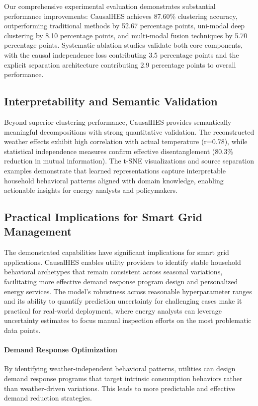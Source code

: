 \documentclass[journal]{IEEEtran}
\begin{document}
Our comprehensive experimental evaluation demonstrates substantial performance improvements: CausalHES achieves 87.60\% clustering accuracy, outperforming traditional methods by 52.67 percentage points, uni-modal deep clustering by 8.10 percentage points, and multi-modal fusion techniques by 5.70 percentage points. Systematic ablation studies validate both core components, with the causal independence loss contributing 3.5 percentage points and the explicit separation architecture contributing 2.9 percentage points to overall performance.

\subsection{Interpretability and Semantic Validation}
Beyond superior clustering performance, CausalHES provides semantically meaningful decompositions with strong quantitative validation. The reconstructed weather effects exhibit high correlation with actual temperature (r=0.78), while statistical independence measures confirm effective disentanglement (80.3\% reduction in mutual information). The t-SNE visualizations and source separation examples demonstrate that learned representations capture interpretable household behavioral patterns aligned with domain knowledge, enabling actionable insights for energy analysts and policymakers.

\subsection{Practical Implications for Smart Grid Management}
The demonstrated capabilities have significant implications for smart grid applications. CausalHES enables utility providers to identify stable household behavioral archetypes that remain consistent across seasonal variations, facilitating more effective demand response program design and personalized energy services. The model's robustness across reasonable hyperparameter ranges and its ability to quantify prediction uncertainty for challenging cases make it practical for real-world deployment, where energy analysts can leverage uncertainty estimates to focus manual inspection efforts on the most problematic data points.

\paragraph{Demand Response Optimization}
By identifying weather-independent behavioral patterns, utilities can design demand response programs that target intrinsic consumption behaviors rather than weather-driven variations. This leads to more predictable and effective demand reduction strategies.
\end{document}
